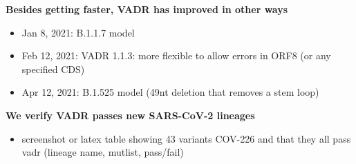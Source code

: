 \documentclass[landscape]{slides}
\begin{document}
\begin{slide}
\begin{center}
\Large{\textbf{Besides getting faster, VADR has improved in other ways}}

\begin{itemize}
\item Jan  8, 2021: B.1.1.7 model
\item Feb 12, 2021: VADR 1.1.3: more flexible to allow errors in ORF8 (or any
  specified CDS) 
\item Apr 12, 2021: B.1.525 model (49nt deletion that removes a stem loop)
\end{itemize}
\end{center}

\vfill
\end{slide}
\begin{slide}
\begin{center}
\Large{\textbf{We verify VADR passes new SARS-CoV-2 lineages}}

\begin{itemize}
\item screenshot or latex table showing 43 variants COV-226 and that
  they all pass vadr (lineage name, mutlist, pass/fail)
\end{itemize}
\end{center}

\vfill
\end{slide}
\end{document}
